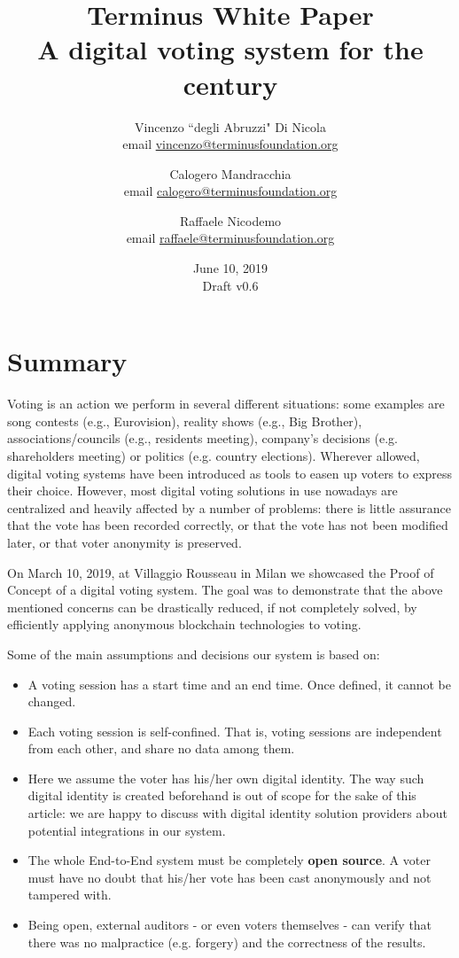\documentclass[10pt, letterpaper]{article}
\begin{document}
\title{Terminus White Paper\\
    \large A digital voting system for the  century}
\author{Vincenzo ``degli Abruzzi" Di Nicola \\ email \href{vincenzo@terminusfoundation.org}{vincenzo@terminusfoundation.org}
    \and Calogero Mandracchia \\ email \href{calogero@terminusfoundation.org}{calogero@terminusfoundation.org}
    \and Raffaele Nicodemo \\ email \href{raffaele@terminusfoundation.org}{raffaele@terminusfoundation.org}
} 
\date{June 10, 2019 \\ Draft v0.6}
\maketitle
\tableofcontents
\newpage

\section{Summary}
Voting is an action we perform in several different situations: some examples are song contests (e.g., Eurovision), reality shows (e.g., Big Brother), associations/councils (e.g., residents meeting), company’s decisions (e.g. shareholders meeting) or politics (e.g. country elections). 
Wherever allowed, digital voting systems have been introduced as tools to easen up voters to express their choice. However, most digital voting solutions in use nowadays are centralized and heavily affected by a number of problems: there is little assurance that the vote has been recorded correctly, or that the vote has not been modified later, or that voter anonymity is preserved.
\bigskip

On March 10, 2019, at Villaggio Rousseau in Milan we showcased the Proof of Concept of a digital voting system. The goal was to demonstrate that the above mentioned concerns can be drastically reduced, if not completely solved, by efficiently applying anonymous blockchain technologies to voting.
\bigskip

Some of the main assumptions and decisions our system is based on:
\begin{itemize}
\item A voting session has a start time and an end time. Once defined, it cannot be changed.
\item Each voting session is self-confined. That is, voting sessions are independent from each other, and share no data among them.
\item Here we assume the voter has his/her own digital identity. The way such digital identity is created beforehand is out of scope for the sake of this article: we are happy to discuss with digital identity solution providers about potential integrations in our system.
\item The whole End-to-End system must be completely \textbf{open source}. A voter must have no doubt that his/her vote has been cast anonymously and not tampered with.
\item Being open, external auditors - or even voters themselves - can verify that there was no malpractice (e.g. forgery) and the correctness of the results.
\end{itemize}
\end{document}
